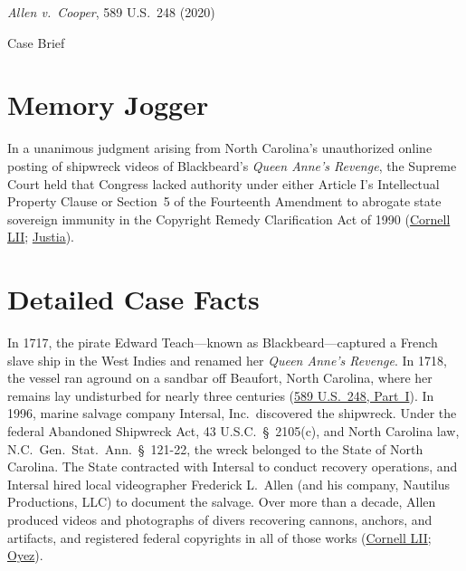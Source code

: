 \documentclass[12pt]{article}
\begin{document}
\begin{center}
{\LARGE \textit{Allen v.\ Cooper}, 589 U.S.\ 248 (2020)\par}
\vspace{0.8em}
{\large Case Brief\par}
\end{center}
\vspace{1em}

\section{Memory Jogger}
In a unanimous judgment arising from North Carolina's unauthorized online posting of shipwreck videos of Blackbeard's \textit{Queen Anne's Revenge}, the Supreme Court held that Congress lacked authority under either Article I's Intellectual Property Clause or Section~5 of the Fourteenth Amendment to abrogate state sovereign immunity in the Copyright Remedy Clarification Act of 1990 (\href{https://www.law.cornell.edu/supremecourt/text/18-877}{Cornell LII}; \href{https://supreme.justia.com/cases/federal/us/589/18-877/}{Justia}).

\section{Detailed Case Facts}
In 1717, the pirate Edward Teach---known as Blackbeard---captured a French slave ship in the West Indies and renamed her \textit{Queen Anne's Revenge}. In 1718, the vessel ran aground on a sandbar off Beaufort, North Carolina, where her remains lay undisturbed for nearly three centuries (\href{https://www.law.cornell.edu/supremecourt/text/18-877}{589 U.S.\ 248, Part~I}). In 1996, marine salvage company Intersal, Inc.\ discovered the shipwreck. Under the federal Abandoned Shipwreck Act, 43 U.S.C.\ \S~2105(c), and North Carolina law, N.C.\ Gen.\ Stat.\ Ann.\ \S~121-22, the wreck belonged to the State of North Carolina. The State contracted with Intersal to conduct recovery operations, and Intersal hired local videographer Frederick L.\ Allen (and his company, Nautilus Productions, LLC) to document the salvage. Over more than a decade, Allen produced videos and photographs of divers recovering cannons, anchors, and artifacts, and registered federal copyrights in all of those works (\href{https://www.law.cornell.edu/supremecourt/text/18-877}{Cornell LII}; \href{https://www.oyez.org/cases/2019/18-877}{Oyez}).
\end{document}
